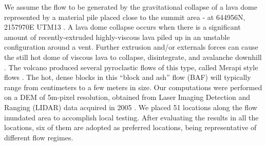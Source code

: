 \documentclass{article}
\begin{document}
We assume the flow to be generated by the gravitational collapse of a lava dome represented by a material pile placed close to the summit area - at 644956N, 2157970E UTM13 \citep{Rupp2006,Aghakhani2016}. A lava dome collapse occurs when there is a significant amount of recently-extruded highly-viscous lava piled up in an unstable configuration around a vent. Further extrusion and/or externals forces can cause the still hot dome of viscous lava to collapse, disintegrate, and avalanche downhill \citep{Bursik2005, Wolpert2016, Hyman2018}. The volcano produced several pyroclastic flows of this type, called Merapi style flows \citep{Macorps2018}. The hot, dense blocks in this ``block and ash'' flow (BAF) will typically range from centimeters to a few meters in size. Our computations were performed on a DEM of 5m-pixel resolution, obtained from Laser Imaging Detection and Ranging (LIDAR) data acquired in 2005 \citep{Davila2007, Sulpizio2010}. We placed 51 locations along the flow inundated area to accomplish local testing. After evaluating the results in all the locations, six of them are adopted as preferred locations, being representative of different flow regimes.
\end{document}
